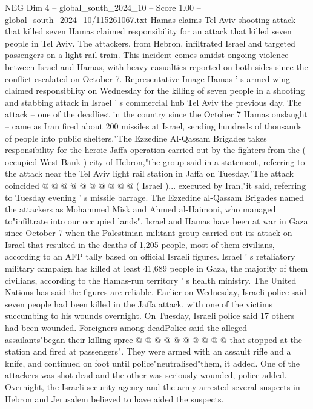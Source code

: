 \begin{textsample}{NEG Dim 4 – global\_south\_2024\_10 – Score 1.00 – global\_south\_2024\_10/115261067.txt}  \label{ex:f4_neg_075}
Hamas claims Tel Aviv shooting attack that killed seven Hamas claimed responsibility for an attack that killed seven people in Tel Aviv.
The attackers, from Hebron, infiltrated Israel and targeted passengers on a light rail train.
This incident comes amidst ongoing violence between Israel and Hamas, with heavy casualties reported on both sides since the conflict escalated on October 7.
Representative Image Hamas ' s armed wing claimed responsibility on Wednesday for the killing of seven people in a shooting and stabbing attack in Israel ' s commercial hub Tel Aviv the previous day.
The attack -- one of the deadliest in the country since the October 7 Hamas onslaught -- came as Iran fired about 200 missiles at Israel, sending hundreds of thousands of people into public shelters."The Ezzedine Al-Qassam Brigades takes responsibility for the heroic Jaffa operation carried out by the fighters from the ( occupied West Bank ) city of Hebron,"the group said in a statement, referring to the attack near the Tel Aviv light rail station in Jaffa on Tuesday."The attack coincided @ @ @ @ @ @ @ @ @ @ ( Israel )... executed by Iran,"it said, referring to Tuesday evening ' s missile barrage.
The Ezzedine al-Qassam Brigades named the attackers as Mohammed Misk and Ahmed al-Haimoni, who managed to"infiltrate into our occupied lands".
Israel and Hamas have been at war in Gaza since October 7 when the Palestinian militant group carried out its attack on Israel that resulted in the deaths of 1,205 people, most of them civilians, according to an AFP tally based on official Israeli figures.
Israel ' s retaliatory military campaign has killed at least 41,689 people in Gaza, the majority of them civilians, according to the Hamas-run territory ' s health ministry.
The United Nations has said the figures are reliable.
Earlier on Wednesday, Israeli police said seven people had been killed in the Jaffa attack, with one of the victims succumbing to his wounds overnight.
On Tuesday, Israeli police said 17 others had been wounded.
Foreigners among deadPolice said the alleged assailants"began their killing spree @ @ @ @ @ @ @ @ @ @ that stopped at the station and fired at passengers".
They were armed with an assault rifle and a knife, and continued on foot until police"neutralised"them, it added.
One of the attackers was shot dead and the other was seriously wounded, police added.
Overnight, the Israeli security agency and the army arrested several suspects in Hebron and Jerusalem believed to have aided the suspects.

\end{textsample}
